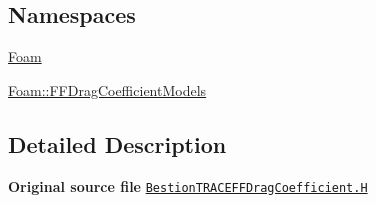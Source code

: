 \subsection*{Namespaces}
\begin{DoxyCompactItemize}
\item 
 \hyperlink{namespaceFoam}{Foam}
\item 
 \hyperlink{namespaceFoam_1_1FFDragCoefficientModels}{Foam\+::\+F\+F\+Drag\+Coefficient\+Models}
\end{DoxyCompactItemize}


\subsection{Detailed Description}
{\bfseries Original source file} \href{../../../home/carlo/data/GeN-Foam/GeN-Foam_ffn/GeN-Foam/GeN-Foam/classes/thermalHydraulics/src/physicsModels/dragModels/FFDragCoefficientModels/BestionTRACE/BestionTRACEFFDragCoefficient.H}{\tt Bestion\+T\+R\+A\+C\+E\+F\+F\+Drag\+Coefficient.\+H} 